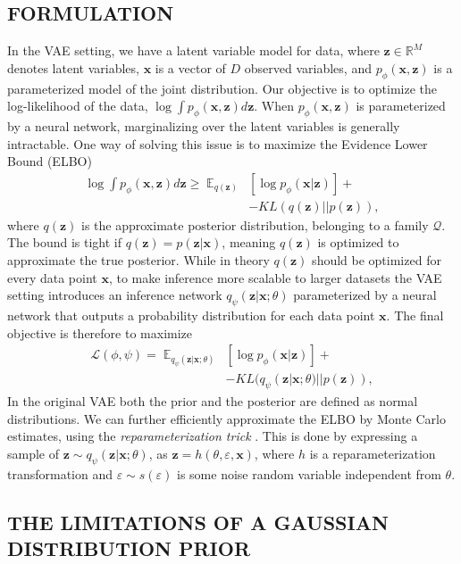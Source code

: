 \documentclass[letterpaper]{article}
\newcommand{\E}{\mathbb{E}}
\newcommand{\x}{\mathbf{x}}
\newcommand{\z}{\mathbf{z}}
\begin{document}
\subsection{FORMULATION} \label{subsec:formulation}
In the VAE setting, we have a latent variable model for data, where $\z \in \mathbb{R}^{M}$ denotes latent variables, $\x$ is a vector of $D$ observed variables, and $p_{\phi}(\x,\z)$ is a parameterized model of the joint distribution. Our objective is to optimize the log-likelihood of the data, $\log \int p_{\phi}(\x,\z) d\z$. When $p_{\phi}(\x,\z)$ is parameterized by a neural network, marginalizing over the latent variables is generally intractable. One way of solving this issue is to maximize the Evidence Lower Bound (ELBO)
\begin{align}
\log \int p_{\phi}(\x,\z) d\z \ge \; \E_{q(\z)}&[\log p_{\phi}(\x|\z)] + \nonumber \\
&- KL(q(\z)||p(\z)),
\end{align}
where $q(\z)$ is the approximate posterior distribution, belonging to a family $\mathcal{Q}$. The bound is tight if $q(\z) = p(\z|\x)$, meaning $q(\z)$ is optimized to approximate the true posterior. While in theory $q(\z)$ should be optimized for every data point $\x$, to make inference more scalable to larger datasets the VAE setting introduces an inference network $q_{\psi}(\z|\x;\theta)$ parameterized by a neural network that outputs a probability distribution for each data point $\x$. The final objective is therefore to maximize
\begin{align}
\mathcal{L}(\phi,\psi) =\; \E_{q_{\psi}(\z|\x;\theta)}&[\log p_{\phi}(\x|\z)] + \nonumber \\
&- KL(q_{\psi}(\z|\x;\theta)||p(\z)),
\end{align}
In the original VAE both the prior and the posterior are defined as normal distributions. We can further efficiently approximate the ELBO by Monte Carlo estimates, using the \textit{reparameterization trick} \citep{journals/corr/KingmaW13, rezende2014stochastic}. This is done by expressing a sample of $\z\sim q_{\psi}(\z|\x;\theta)$, as $\z = h(\theta,\varepsilon,\x)$, where $h$ is a reparameterization transformation and $\varepsilon\sim s(\varepsilon)$ is some noise random variable independent from $\theta$.

\subsection{THE LIMITATIONS OF A GAUSSIAN DISTRIBUTION PRIOR} \label{subsec:lim-gaussian-prior}
\end{document}
